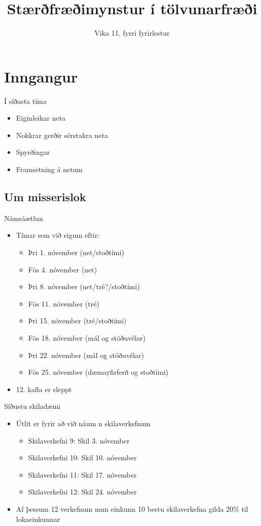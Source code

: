 \documentclass{beamer}
\title{Stærðfræðimynstur í tölvunarfræði}
\subtitle{Vika 11, fyrri fyrirlestur}
\begin{document}
\begin{frame}
\titlepage
\end{frame}


\section{Inngangur}

\begin{frame}{Í síðasta tíma}
\begin{itemize}
 \item Eiginleikar neta
 \item Nokkrar gerðir sérstakra neta
 \item Spyrðingar
 \item Framsetning á netum
\end{itemize}
\end{frame}

\subsection{Um misserislok}

\begin{frame}{Námsáætlun}
\begin{itemize}
 \item Tímar sem við eigum eftir:
 \begin{itemize}
  \item Þri 1. nóvember (net/stoðtími)
  \item Fös 4. nóvember (net)
  \item Þri 8. nóvember (net/tré?/stoðtími)
  \item Fös 11. nóvember (tré)
  \item Þri 15. nóvember (tré/stoðtími)
  \item Fös 18. nóvember (mál og stöðuvélar)
  \item Þri 22. nóvember (mál og stöðuvélar)
  \item Fös 25. nóvember (dæmayfirferð og stoðtími)
 \end{itemize}
 \item 12. kafla er sleppt
\end{itemize}

\end{frame}


\begin{frame}{Síðustu skiladæmi}
\begin{itemize}
 \item Útlit er fyrir að við náum n skilaverkefnum
 \begin{itemize}
  \item Skilaverkefni 9: Skil 3. nóvember
  \item Skilaverkefni 10: Skil 10. nóvember 
  \item Skilaverkefni 11: Skil 17. nóvember
  \item Skilaverkefni 12: Skil 24. nóvember
 \end{itemize}
 \item Af þessum 12 verkefnum mun einkunn 10 bestu skilaverkefna gilda 20\% til lokaeinkunnar
\end{itemize}
\end{frame}
\end{document}
